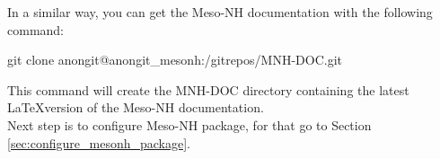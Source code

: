 In a similar way, you can get the Meso-NH documentation with the following command:
\begin{bashcode}
git clone anongit@anongit_mesonh:/gitrepos/MNH-DOC.git
\end{bashcode}

This command will create the MNH-DOC directory containing the latest \LaTeX version of the Meso-NH documentation. \\

Next step is to configure Meso-NH package, for that go to Section \ref{sec:configure_mesonh_package}.

 